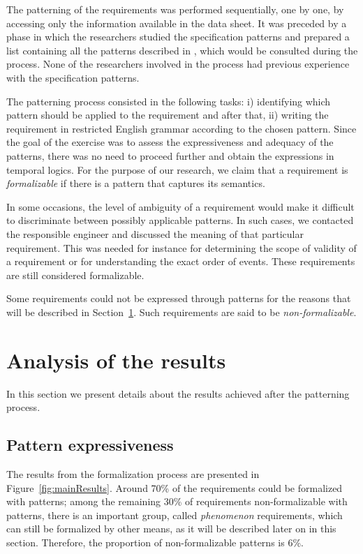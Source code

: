 \documentclass[conference]{IEEEtran}
\begin{document}
The patterning of the requirements was performed sequentially, one by one, by accessing only the information available in the data sheet. It was preceded by a phase in which the researchers studied the specification patterns and prepared a list
containing all the patterns described in \cite{Post12bosch}, which would be consulted during the process. None of the researchers involved in the process had previous experience with the specification patterns. 

The patterning process consisted in the following tasks: i) identifying which pattern should be applied to the requirement and after that, ii) writing the requirement in restricted English grammar according to the chosen pattern.
Since the goal of the exercise was to assess the expressiveness and adequacy of the patterns, there was no need to proceed further and obtain the expressions in temporal logics. For the purpose of our research, we claim that a requirement is \emph{formalizable} if there is a pattern that captures its semantics.

In some occasions, the level of ambiguity of a requirement would make it difficult to discriminate between possibly applicable patterns. In such cases, we contacted the responsible engineer and discussed the meaning of that particular requirement. This was needed for instance for determining the scope of validity of a requirement or for understanding the exact order of events. These requirements are still considered formalizable.

Some requirements could not be expressed through patterns for the reasons that will be described in Section~\ref{sec:anares}. Such requirements are said to be \emph{non-formalizable}.

\section{Analysis of the results}
\label{sec:anares}

In this section we present details about the results achieved after the patterning process.

\subsection{Pattern expressiveness}
The results from the formalization process are presented in Figure~\ref{fig:mainResults}. Around 70\% of the requirements could  be formalized with patterns; among the remaining 30\% of requirements non-formalizable with patterns, there is an important group,  called \emph{phenomenon} requirements, which can still be formalized by other means, as it will be described later on in this section. Therefore, the proportion of non-formalizable patterns is 6\%.\\
\end{document}
